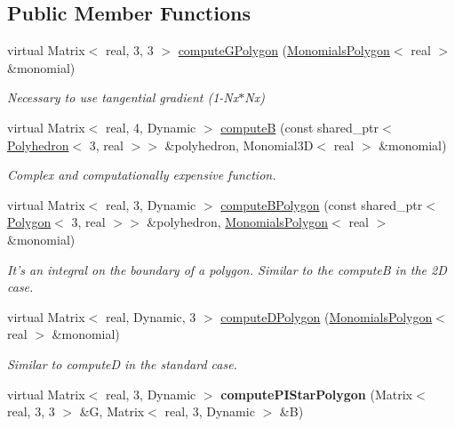 \subsection*{\-Public \-Member \-Functions}
\begin{DoxyCompactItemize}
\item 
virtual \-Matrix$<$ real, 3, 3 $>$ \hyperlink{class_solver_v_e_m3_d_ac318979a89811fbaf443188a13348f8f}{compute\-G\-Polygon} (\hyperlink{class_monomials_polygon}{\-Monomials\-Polygon}$<$ real $>$ \&monomial)
\begin{DoxyCompactList}\small\item\em \-Necessary to use tangential gradient (1-\/\-Nx$\ast$\-Nx) \end{DoxyCompactList}\item 
virtual \-Matrix$<$ real, 4, \-Dynamic $>$ \hyperlink{class_solver_v_e_m3_d_ac87df82bf52bde30ba14e00ca049faf8}{compute\-B} (const shared\-\_\-ptr$<$ \hyperlink{class_polyhedron}{\-Polyhedron}$<$ 3, real $>$$>$ \&polyhedron, \-Monomial3\-D$<$ real $>$ \&monomial)
\begin{DoxyCompactList}\small\item\em \-Complex and computationally expensive function. \end{DoxyCompactList}\item 
\hypertarget{class_solver_v_e_m3_d_afe89753106e3d3be0fdce44620fbbc03}{virtual \-Matrix$<$ real, 3, \-Dynamic $>$ \hyperlink{class_solver_v_e_m3_d_afe89753106e3d3be0fdce44620fbbc03}{compute\-B\-Polygon} (const shared\-\_\-ptr$<$ \hyperlink{class_polygon}{\-Polygon}$<$ 3, real $>$$>$ \&polyhedron, \hyperlink{class_monomials_polygon}{\-Monomials\-Polygon}$<$ real $>$ \&monomial)}\label{class_solver_v_e_m3_d_afe89753106e3d3be0fdce44620fbbc03}

\begin{DoxyCompactList}\small\item\em \-It's an integral on the boundary of a polygon. \-Similar to the compute\-B in the 2\-D case. \end{DoxyCompactList}\item 
\hypertarget{class_solver_v_e_m3_d_a390dd7d1654bee6686b76e6a08579416}{virtual \-Matrix$<$ real, \-Dynamic, 3 $>$ \hyperlink{class_solver_v_e_m3_d_a390dd7d1654bee6686b76e6a08579416}{compute\-D\-Polygon} (\hyperlink{class_monomials_polygon}{\-Monomials\-Polygon}$<$ real $>$ \&monomial)}\label{class_solver_v_e_m3_d_a390dd7d1654bee6686b76e6a08579416}

\begin{DoxyCompactList}\small\item\em \-Similar to compute\-D in the standard case. \end{DoxyCompactList}\item 
\hypertarget{class_solver_v_e_m3_d_ae5ebe2417660a9688446d93e998579cc}{virtual \-Matrix$<$ real, 3, \-Dynamic $>$ {\bfseries compute\-P\-I\-Star\-Polygon} (\-Matrix$<$ real, 3, 3 $>$ \&\-G, \-Matrix$<$ real, 3, \-Dynamic $>$ \&\-B)}\label{class_solver_v_e_m3_d_ae5ebe2417660a9688446d93e998579cc}


\end{DoxyCompactItemize}
